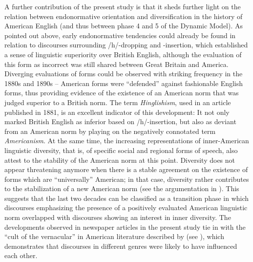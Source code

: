 A further contribution of the present study is that it sheds further light on the relation between endonormative orientation and diversification in the history of American English (and thus between phase 4 and 5 of the Dynamic Model). As pointed out above, early endonormative tendencies could already be found in relation to discourses surrounding /h/-dropping and -insertion, which established a sense of linguistic superiority over British English, although the evaluation of this form as incorrect was still shared between Great Britain and America. Diverging evaluations of forms could be observed with striking frequency in the 1880s and 1890s – American forms were “defended” against fashionable English forms, thus providing evidence of the existence of an American norm that was judged superior to a British norm. The term \emph{Hinglishism}, used in an article published in 1881, is an excellent indicator of this development: It not only marked British English as inferior based on /h/-insertion, but also as deviant from an American norm by playing on the negatively connotated term \emph{Americanism}. At the same time, the increasing representations of inner-American linguistic diversity, that is, of specific social and regional forms of speech, also attest to the stability of the American norm at this point. Diversity does not appear threatening anymore when there is a stable agreement on the existence of forms which are “universally” American; in that case, diversity rather contributes to the stabilization of a new American norm (see the argumentation in ). This suggests that the last two decades can be classified as a transition phase in which discourses emphasizing the presence of a positively evaluated American linguistic norm overlapped with discourses showing an interest in inner diversity. The developments observed in newspaper articles in the present study tie in with the “cult of the vernacular” in American literature described by \citet{Jones1999} (see ), which demonstrates that discourses in different genres were likely to have influenced each other.

